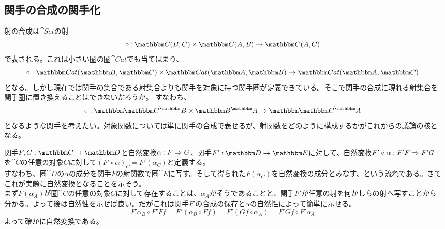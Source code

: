   \subsection{関手の合成の関手化}
  射の合成は$\cat{Set}$の射\[\mor{\circ}{\arset{C}{B}{C}\times\arset{C}{A}{B}}{\arset{C}{A}{C}}\]で表される。これは小さい圏の圏$\cat{Cat}$でも当てはまり、\[\mor{\circ}{\arset{Cat}{\cat{B}}{\cat{C}}\times\arset{Cat}{\cat{A}}{\cat{B}}}{\arset{Cat}{\cat{A}}{\cat{C}}}\]となる。しかし現在では関手の集合である射集合よりも関手を対象に持つ関手圏が定義できている。そこで関手の合成に現れる射集合を関手圏に置き換えることはできないだろうか。
  すなわち、\[\functor{\circ}{\funccat{B}{C}\times\funccat{A}{B}}{\funccat{A}{C}}\]となるような関手を考えたい。対象関数については単に関手の合成で表せるが、射関数をどのように構成するかがこれからの議論の核となる。
  \begin{define}[自然変換と関手の合成]
    関手$\functor{F,G}{C}{D}$と自然変換$\alpha:F\Rightarrow G$、関手$\functor{F'}{D}{E}$に対して、自然変換$F'\circ\alpha:F'F\Rightarrow F'G$を$\cat{C}$の任意の対象$C$に対して$(F'\circ\alpha)_C=F'(\alpha_C)$と定義する。\\
    すなわち、圏$\cat{D}$の$\alpha$の成分を関手$F$の射関数で圏$\cat{E}$に写す。そして得られた$F(\alpha_C)$を自然変換の成分とみなす、という流れである。さてこれが実際に自然変換となることを示そう。\\
    まず$F(\alpha_A)$が圏$\cat{C}$の任意の対象$C$に対して存在することは、$\alpha_A$がそうであることと、関手$F'$が任意の射を何かしらの射へ写すことから分かる。よって後は自然性を示せば良い。だがこれは関手$F'$の合成の保存と$\alpha$の自然性によって簡単に示せる。
    \[F'\alpha_B\circ F'Ff=F'(\alpha_B\circ Ff)=F'(Gf\circ\alpha_A)=F'Gf\circ F'\alpha_A\]よって確かに自然変換である。
    \begin{center}
\end{center}
\end{define}
